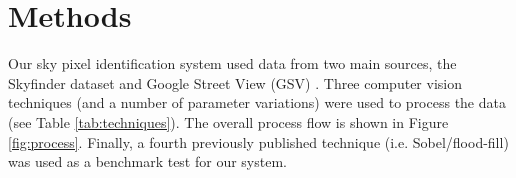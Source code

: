 \documentclass[final,3p,times,authoryear]{elsarticle}
\begin{document}
\section{Methods}\label{sec:Methods}
Our sky pixel identification system used data from two main sources, the Skyfinder dataset \citep{Mihail2016} and Google Street View (GSV) \citep{GoogleMaps2017b}. Three computer vision techniques (and a number of parameter variations) were used to process the data (see Table \ref{tab:techniques}). The overall process flow is shown in Figure \ref{fig:process}. Finally, a fourth previously published technique (i.e. Sobel/flood-fill) was used as a benchmark test for our system.







\end{document}

